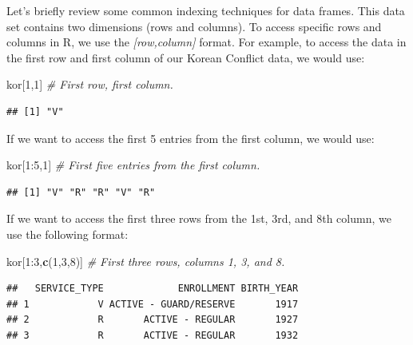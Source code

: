 \documentclass[]{book}
\newenvironment{Shaded}{\begin{snugshade}}{\end{snugshade}}
\newcommand{\KeywordTok}[1]{\textcolor[rgb]{0.13,0.29,0.53}{\textbf{{#1}}}}
\newcommand{\DecValTok}[1]{\textcolor[rgb]{0.00,0.00,0.81}{{#1}}}
\newcommand{\CommentTok}[1]{\textcolor[rgb]{0.56,0.35,0.01}{\textit{{#1}}}}
\newcommand{\NormalTok}[1]{{#1}}
\begin{document}
Let's briefly review some common indexing techniques for data frames.
This data set contains two dimensions (rows and columns). To access
specific rows and columns in R, we use the \emph{{[}row,column{]}}
format. For example, to access the data in the first row and first
column of our Korean Conflict data, we would use:

\begin{Shaded}
\begin{Highlighting}[]
\NormalTok{kor[}\DecValTok{1}\NormalTok{,}\DecValTok{1}\NormalTok{]  }\CommentTok{# First row, first column.}
\end{Highlighting}
\end{Shaded}

\begin{verbatim}
## [1] "V"
\end{verbatim}

If we want to access the first 5 entries from the first column, we would
use:

\begin{Shaded}
\begin{Highlighting}[]
\NormalTok{kor[}\DecValTok{1}\NormalTok{:}\DecValTok{5}\NormalTok{,}\DecValTok{1}\NormalTok{] }\CommentTok{# First five entries from the first column.}
\end{Highlighting}
\end{Shaded}

\begin{verbatim}
## [1] "V" "R" "R" "V" "R"
\end{verbatim}

If we want to access the first three rows from the 1st, 3rd, and 8th
column, we use the following format:

\begin{Shaded}
\begin{Highlighting}[]
\NormalTok{kor[}\DecValTok{1}\NormalTok{:}\DecValTok{3}\NormalTok{,}\KeywordTok{c}\NormalTok{(}\DecValTok{1}\NormalTok{,}\DecValTok{3}\NormalTok{,}\DecValTok{8}\NormalTok{)] }\CommentTok{# First three rows, columns 1, 3, and 8.}
\end{Highlighting}
\end{Shaded}

\begin{verbatim}
##   SERVICE_TYPE             ENROLLMENT BIRTH_YEAR
## 1            V ACTIVE - GUARD/RESERVE       1917
## 2            R       ACTIVE - REGULAR       1927
## 3            R       ACTIVE - REGULAR       1932
\end{verbatim}
\end{document}
